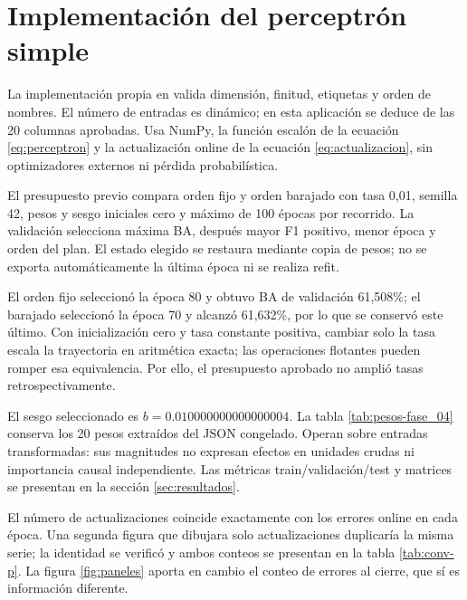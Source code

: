 \barrerapagina
\section{Implementación del perceptrón simple}
La implementación propia en  valida dimensión, finitud, etiquetas y orden de nombres. El número de entradas es dinámico; en esta aplicación se deduce de las 20 columnas aprobadas. Usa NumPy, la función escalón de la ecuación \ref{eq:perceptron} y la actualización online de la ecuación \ref{eq:actualizacion}, sin optimizadores externos ni pérdida probabilística.

El presupuesto previo compara orden fijo y orden barajado con tasa 0,01, semilla 42, pesos y sesgo iniciales cero y máximo de 100 épocas por recorrido. La validación selecciona máxima BA, después mayor F1 positivo, menor época y orden del plan. El estado elegido se restaura mediante copia de pesos; no se exporta automáticamente la última época ni se realiza refit.

El orden fijo seleccionó la época 80 y obtuvo BA de validación 61,508\%; el barajado seleccionó la época 70 y alcanzó 61,632\%, por lo que se conservó este último. Con inicialización cero y tasa constante positiva, cambiar solo la tasa escala la trayectoria en aritmética exacta; las operaciones flotantes pueden romper esa equivalencia. Por ello, el presupuesto aprobado no amplió tasas retrospectivamente.

El sesgo seleccionado es $b=0.010000000000000004$. La tabla \ref{tab:pesos-fase_04} conserva los 20 pesos extraídos del JSON congelado. Operan sobre entradas transformadas: sus magnitudes no expresan efectos en unidades crudas ni importancia causal independiente. Las métricas train/validación/test y matrices se presentan en la sección \ref{sec:resultados}.

El número de actualizaciones coincide exactamente con los errores online en cada época. Una segunda figura que dibujara solo actualizaciones duplicaría la misma serie; la identidad se verificó y ambos conteos se presentan en la tabla \ref{tab:conv-p}. La figura \ref{fig:paneles} aporta en cambio el conteo de errores al cierre, que sí es información diferente.

